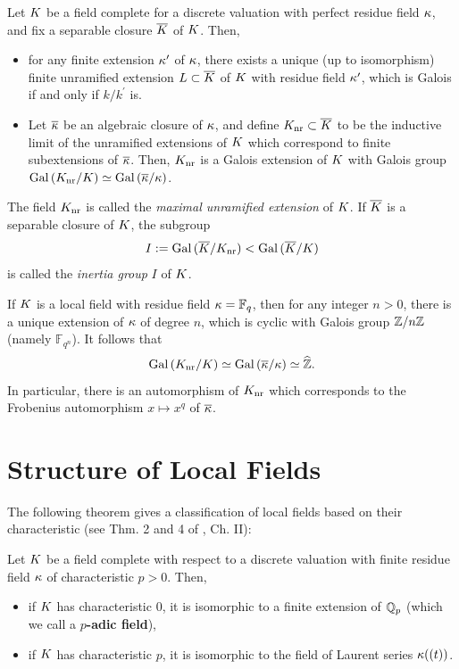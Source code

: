 \documentclass[a4paper, oneside]{memoir}
\begin{document}
\begin{theorem}Let $K$ be a field complete for a discrete valuation with perfect residue field $\kappa$, and fix a separable closure $\overline{K}$ of $K$. Then,
	\begin{itemize}
		\item for any finite extension $\kappa^{\prime} $ of \(\kappa\), there exists a unique (up to isomorphism) finite unramified extension $L \subset \overline{K}$ of $K$ with residue field $\kappa^{\prime} $, which is Galois if and only if $k/k^{\prime}$ is.
		\item Let \(\overline{\kappa}\) be an algebraic closure of \(\kappa\), and define $K_{\text{nr}}\subset \overline{K}$ to be the inductive limit of the unramified extensions of $K$ which correspond to finite subextensions of $\overline{\kappa}$. Then, $K_{\text{nr}}$ is a Galois extension of $K$ with Galois group $\operatorname{Gal}{(K_{\text{nr}}/K)}\simeq \operatorname{Gal}{(\overline{\kappa}/\kappa)}$.
	\end{itemize}
\end{theorem}

The field $K_{\text{nr}}$ is called the \textit{maximal unramified extension} of $K$. If $\overline{K}$ is a separable closure of $K$, the subgroup
\[
	I:=\operatorname{Gal}{(\overline{K}/K_{\text{nr}})} < \operatorname{Gal}{(\overline{K}/K)}
\]
is called the \textit{inertia group} $I$ of $K$.

\begin{example}\label{ex:FinFields}
	If $K$ is a local field with residue field $\kappa=\mathbb{F}_q$, then for any integer $n>0$, there is a unique extension of $\kappa$ of degree $n$, which is cyclic with Galois group $\mathbb{Z}/n\mathbb{Z}$ (namely $\mathbb{F}_{q^n}$). It follows that
	\[
		\operatorname{Gal}{(K_{\text{nr}}/K)}\simeq \operatorname{Gal}{(\overline{\kappa} / \kappa)}\simeq \widehat{\mathbb{Z}}.
	\]
	In particular, there is an automorphism of $K_{\text{nr}}$ which corresponds to the Frobenius automorphism $x\mapsto x^q$ of $\overline{\kappa}$.
\end{example}

\section{Structure of Local Fields}

The following theorem gives a classification of local fields based on their characteristic (see Thm. 2 and 4 of \cite{SerreCL}, Ch. II):

\begin{theorem}
	Let $K$ be a field complete with respect to a discrete valuation with finite residue field $\kappa$ of characteristic $p>0$. Then,
	\begin{itemize}
		\item if $K$ has characteristic $0$, it is isomorphic to a finite extension of $\mathbb{Q}_p$ (which we call a \textbf{$p$-adic field}),
		\item if $K$ has characteristic $p$, it is isomorphic to the field of Laurent series $\kappa((t))$.
	\end{itemize}
\end{theorem}
\end{document}
